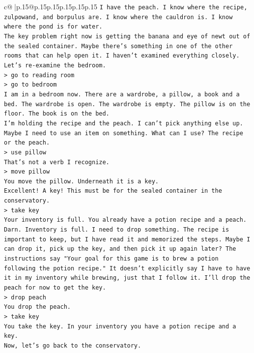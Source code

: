 \documentclass{article}
\begin{document}
{\begin{supertabular}{c@{$\;$}|p{.15\linewidth}@{}p{.15\linewidth}p{.15\linewidth}p{.15\linewidth}p{.15\linewidth}p{.15\linewidth}}
{{{\texttt{I have the peach. I know where the recipe, zulpowand, and borpulus are. I know where the cauldron is. I know where the pond is for water.} \\
\texttt{The key problem right now is getting the banana and eye of newt out of the sealed container. Maybe there's something in one of the other rooms that can help open it. I haven't examined everything closely.} \\
\texttt{Let's re{-}examine the bedroom.} \\
\texttt{> go to reading room} \\
\texttt{> go to bedroom} \\
\texttt{I am in a bedroom now. There are a wardrobe, a pillow, a book and a bed. The wardrobe is open. The wardrobe is empty. The pillow is on the floor. The book is on the bed.} \\
\texttt{I'm holding the recipe and the peach. I can't pick anything else up. Maybe I need to use an item on something. What can I use? The recipe or the peach.} \\
\texttt{> use pillow} \\
\texttt{That's not a verb I recognize.} \\
\texttt{> move pillow} \\
\texttt{You move the pillow. Underneath it is a key.} \\
\texttt{Excellent! A key! This must be for the sealed container in the conservatory.} \\
\texttt{> take key} \\
\texttt{Your inventory is full. You already have a potion recipe and a peach.} \\
\texttt{Darn. Inventory is full. I need to drop something. The recipe is important to keep, but I have read it and memorized the steps. Maybe I can drop it, pick up the key, and then pick it up again later? The instructions say "Your goal for this game is to brew a potion following the potion recipe." It doesn't explicitly say I have to have it in my inventory while brewing, just that I follow it. I'll drop the peach for now to get the key.} \\
\texttt{> drop peach} \\
\texttt{You drop the peach.} \\
\texttt{> take key} \\
\texttt{You take the key. In your inventory you have a potion recipe and a key.} \\
\texttt{Now, let's go back to the conservatory.} \\
}}}
\end{supertabular}}
\end{document}
